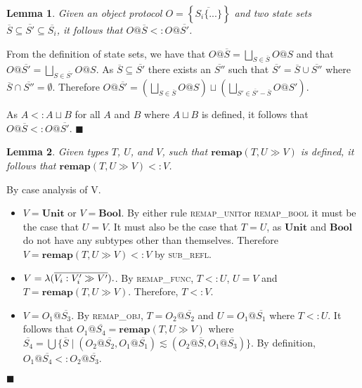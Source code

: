\documentclass[preprint]{sigplanconf}
\makeatletter
\newtheorem{lem}{Lemma}
\newcommand{\subrefl}{\textsc{sub\_refl}}
\newcommand{\remapunit}{\textsc{remap\_unit}}
\newcommand{\remapbool}{\textsc{remap\_bool}}
\newcommand{\remapfunc}{\textsc{remap\_func}}
\newcommand{\remapobj}{\textsc{remap\_obj}}
\newcommand{\remapapp}[3]{\ensuremath{\mathbf{remap}(#1, #2 \gg #3)}}
\newcommand{\unitt}{\mathbf{Unit}}
\newcommand{\boolt}{\mathbf{Bool}}
\newcommand{\ot}[2]{#1@\overline{#2}}
\newcommand{\funv}[4]{\lambda(\overline{#1 : #2 \gg #3}).#4}
\newcommand{\qed}{$\blacksquare$}
\newenvironment{proof}{\vspace{1ex}\noindent{\bf Proof}\hspace{0.5em}}
  {\hfill\qed\vspace{1ex}}
\makeatother
\begin{document}
\begin{lem}
\label{lem:ssetinc}
Given an object protocol $O = \left\{ \overline{ S_i \{ ... \} } \right\}$ and two state sets 
$\overline{S} \subseteq \overline{S'} \subseteq \overline{S_i}$, it follows
that $O@\overline{S} <: O@\overline{S'}$.
\end{lem}
\begin{proof}
From the definition of state sets, we have that 
$O@\overline{S} = \bigsqcup_{S \in \overline{S}}{O@S}$ and that
$O@\overline{S'} = \bigsqcup_{S \in \overline{S'}}{O@S}$.
As $\overline{S} \subseteq \overline{S'}$ there exists an
$\overline{S''}$ such that $\overline{S'} = \overline{S} \cup \overline{S''}$
where $\overline{S} \cap \overline{S''} = \emptyset$. Therefore
$O@\overline{S'} = \left(\bigsqcup_{S \in \overline{S}}{O@S}\right) \sqcup \left(\bigsqcup_{S' \in \overline{S'} - \overline{S}}{O@S'}\right)$.

As $A <: A \sqcup B$ for all $A$ and $B$ where $A \sqcup B$ is defined, 
it follows that $O@\overline{S} <: O@\overline{S'}$.
\end{proof}


\begin{lem}
\label{lem:remap}
Given types $T$, $U$, and $V$, such that
$\remapapp{T}{U}{V}$ is defined, it follows that $\remapapp{T}{U}{V} <: V$.
\end{lem}
\begin{proof}
By case analysis of V.

\begin{itemize}
\item $V = \unitt$ or $V = \boolt$. By either rule \remapunit or \remapbool
it must be the case that $U = V$. It must also be the case that
$T = U$, as $\unitt$ and $\boolt$ do not have any subtypes other than
themselves. Therefore $V = \remapapp{T}{U}{V} <: V$ by \subrefl.

\item $V = \funv{V_i}{V_i'}{V'}$. By \remapfunc, 
$T <: U$, $U = V$ and $T = \remapapp{T}{U}{V}$. Therefore, $T <: V$.

\item $V = \ot{O_1}{S_3}$. By
\remapobj, $T = \ot{O_2}{S_2}$ and $U = \ot{O_1}{S_1}$
where $T <: U$. It follows that $\ot{O_1}{S_4} = \remapapp{T}{U}{V}$
where 
$\overline{S_4} = \bigcup \{ \overline{S} \mid (\ot{O_2}{S_2}, \ot{O_1}{S_1}) \lesssim (\ot{O_2}{S}, \ot{O_1}{S_3}) \}$. By definition, $\ot{O_1}{S_4} <: \ot{O_2}{S_3}$.

\end{itemize}
\end{proof}
\end{document}
